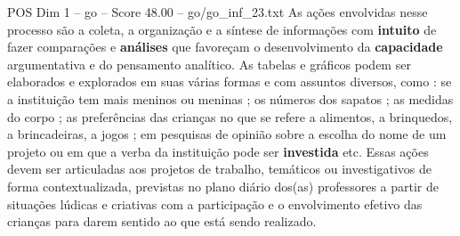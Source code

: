 \begin{textsample}{POS Dim 1 – go – Score 48.00 – go/go\_inf\_23.txt}
As ações envolvidas nesse processo são a coleta, a organização e a síntese de informações com \textbf{intuito} de fazer comparações e \textbf{análises} que favoreçam o desenvolvimento da \textbf{capacidade} argumentativa e do pensamento analítico.
As tabelas e gráficos podem ser elaborados e explorados em suas várias formas e com assuntos diversos, como : se a instituição tem mais meninos ou meninas ; os números dos sapatos ; as medidas do corpo ; as preferências das crianças no que se refere a alimentos, a brinquedos, a brincadeiras, a jogos ; em pesquisas de opinião sobre a escolha do nome de um projeto ou em que a verba da instituição pode ser \textbf{investida} etc.
Essas ações devem ser articuladas aos projetos de trabalho, temáticos ou investigativos de forma contextualizada, previstas no plano diário dos(as) professores a partir de situações lúdicas e criativas com a participação e o envolvimento efetivo das crianças para darem sentido ao que está sendo realizado.

\end{textsample}
